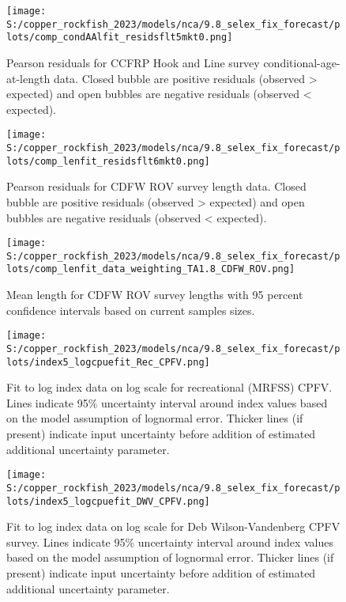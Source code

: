 \documentclass[11pt,
  english,
  letterpaper,
]{article}
\begin{document}
\pagebreak

\begin{figure}
\centering
\texttt{[image: S:/copper\_rockfish\_2023/models/nca/9.8\_selex\_fix\_forecast/plots/comp\_condAAlfit\_residsflt5mkt0.png]}
\caption{Pearson residuals for CCFRP Hook and Line survey conditional-age-at-length data. Closed bubble are positive residuals (observed \textgreater{} expected) and open bubbles are negative residuals (observed \textless{} expected).\label{fig:ccfrp-age-pearson}}
\end{figure}

\pagebreak

\begin{figure}
\centering
\texttt{[image: S:/copper\_rockfish\_2023/models/nca/9.8\_selex\_fix\_forecast/plots/comp\_lenfit\_residsflt6mkt0.png]}
\caption{Pearson residuals for CDFW ROV survey length data. Closed bubble are positive residuals (observed \textgreater{} expected) and open bubbles are negative residuals (observed \textless{} expected).\label{fig:rov-pearson}}
\end{figure}

\pagebreak

\begin{figure}
\centering
\texttt{[image: S:/copper\_rockfish\_2023/models/nca/9.8\_selex\_fix\_forecast/plots/comp\_lenfit\_data\_weighting\_TA1.8\_CDFW\_ROV.png]}
\caption{Mean length for CDFW ROV survey lengths with 95 percent confidence intervals based on current samples sizes.\label{fig:rov-mean-len-fit}}
\end{figure}

\pagebreak

\begin{figure}
\centering
\texttt{[image: S:/copper\_rockfish\_2023/models/nca/9.8\_selex\_fix\_forecast/plots/index5\_logcpuefit\_Rec\_CPFV.png]}
\caption{Fit to log index data on log scale for recreational (MRFSS) CPFV. Lines indicate 95\% uncertainty interval around index values based on the model assumption of lognormal error. Thicker lines (if present) indicate input uncertainty before addition of estimated additional uncertainty parameter.\label{fig:mrfss-cpfv-index-fit}}
\end{figure}

\pagebreak

\begin{figure}
\centering
\texttt{[image: S:/copper\_rockfish\_2023/models/nca/9.8\_selex\_fix\_forecast/plots/index5\_logcpuefit\_DWV\_CPFV.png]}
\caption{Fit to log index data on log scale for Deb Wilson-Vandenberg CPFV survey. Lines indicate 95\% uncertainty interval around index values based on the model assumption of lognormal error. Thicker lines (if present) indicate input uncertainty before addition of estimated additional uncertainty parameter.\label{fig:dwv-cpfv-index-fit}}
\end{figure}
\end{document}

